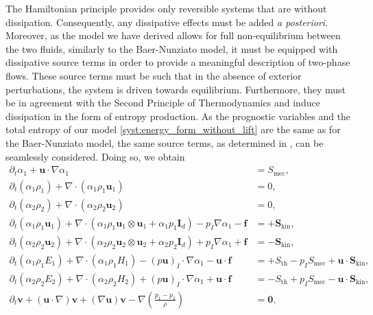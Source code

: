 \documentclass{myclass}
\newcommand{\Id}{\mathbf{I}_d}
\newcommand{\vel}{\bm{u}}
\newcommand{\lift}{\bm{f}}
\newcommand{\pth}[1]  {\left( #1 \right)}
\begin{document}
The Hamiltonian principle provides only reversible systems that are without dissipation. Consequently, any dissipative effects must be added \textit{a posteriori}. Moreover, as the model we have derived allows for full non-equilibrium between the two fluids, similarly to the Baer-Nunziato model, it must be equipped with dissipative source terms in order to provide a meaningful description of two-phase flows. These source terms must be such that in the absence of exterior perturbations, the system is driven towards equilibrium. Furthermore, they must be in agreement with the Second Principle of Thermodynamics and induce dissipation in the form of entropy production. As the prognostic variables and the total entropy of our model \eqref{syst:energy_form_without_lift} are the same as for the Baer-Nunziato model, the same source terms, as determined in \cite{baer:1986,kapila:2001,saurel:2001,muller:2016,perrier:2021}, can be seamlessly considered. Doing so, we obtain
\begin{subequations}
\begin{align}
\partial_t\alpha_1 + \vel\cdot\nabla\alpha_1 &= S_{\text{mec}},\\
\partial_t \pth{\alpha_1\rho_1} + \nabla\cdot\pth{\alpha_1\rho_1 \vel_1} &=0,\\
\partial_t \pth{\alpha_2\rho_2} + \nabla\cdot\pth{\alpha_2\rho_2 \vel_2} &=0,\\
\partial_t\pth{\alpha_1\rho_1\vel_1} + \nabla\cdot\pth{\alpha_1\rho_1\vel_1\otimes\vel_1 + \alpha_1 p_1\Id} - p_I\nabla\alpha_1 -\lift &=+\bm{S}_{\text{kin}},\\
\partial_t\pth{\alpha_2\rho_2\vel_2} + \nabla\cdot\pth{\alpha_2\rho_2\vel_2\otimes\vel_2 + \alpha_2 p_2\Id} + p_I\nabla\alpha_1 +\lift &=-\bm{S}_{\text{kin}},\\
\partial_t\pth{\alpha_1\rho_1 E_1} + \nabla\cdot\pth{\alpha_1\rho_1 H_1} - \pth{p\vel}_I\cdot\nabla\alpha_1 - \vel\cdot\lift &= +S_{\text{th}} -p_I S_{\text{mec}}  + \vel\cdot \bm{S}_{\text{kin}},\\
\partial_t\pth{\alpha_2\rho_2 E_2} + \nabla\cdot\pth{\alpha_2\rho_2 H_2} + \pth{p\vel}_I\cdot\nabla\alpha_1 + \vel\cdot\lift &= -S_{\text{th}} +p_I S_{\text{mec}} - \vel\cdot \bm{S}_{\text{kin}},\\
\partial_t \bm{v} + \pth{\vel\cdot\nabla}\bm{v} + \pth{\nabla\vel}\bm{v} - \nabla\pth{\frac{p_1-p_2}{\rho}} &= \bm{0}, \label{syst:v_eq_thermo}
\end{align}\label{syst:energy_form_with_source_terms}
\end{subequations}
\end{document}
